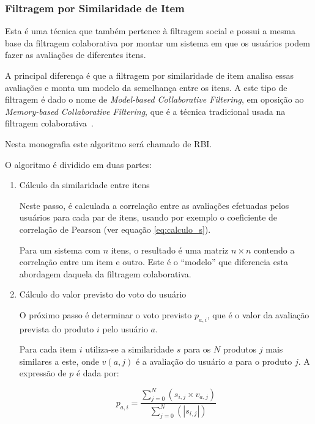 
\subsubsection{Filtragem por Similaridade de Item}

Esta é uma técnica que também pertence à filtragem social e possui a mesma base da filtragem colaborativa por montar um sistema em que os usuários podem fazer as avaliações de diferentes itens.

A principal diferença é que a filtragem por similaridade de item analisa essas avaliações e monta um modelo da semelhança entre os itens. A este tipo de filtragem é dado o nome de \textit{Model-based Collaborative Filtering}, em oposição ao \textit{Memory-based Collaborative Filtering}, que é a técnica tradicional usada na filtragem colaborativa~\cite{sarwar01}.

Nesta monografia este algoritmo será chamado de RBI.

O algoritmo é dividido em duas partes:

\begin{enumerate}
\item{Cálculo da similaridade entre itens}

Neste passo, é calculada a correlação entre as avaliações efetuadas pelos usuários para cada par de itens, usando por exemplo o coeficiente de correlação de Pearson (ver equação \ref{eq:calculo_s}).

Para um sistema com $n$ itens, o resultado é uma matriz $n \times n$ contendo a correlação entre um item e outro. Este é o ``modelo'' que diferencia esta abordagem daquela da filtragem colaborativa.

\item{Cálculo do valor previsto do voto do usuário}

O próximo passo é determinar o voto previsto $p_{a,i}$, que é o valor da avaliação prevista do produto $i$ pelo usuário $a$.

Para cada item $i$ utiliza-se a similaridade $s$ para os $N$ produtos $j$ mais similares a este, onde $v(a,j)$ é a avaliação do usuário $a$ para o produto $j$. A expressão de $p$ é dada por:

\begin{equation}
 p_{a,i} = \frac{\sum_{j=0}^N{(s_{i,j} \times v_{a, j})}}{\sum_{j=0}^N{(|s_{i,j}|)}}
 \label{eq:filtragem_item_based} 
\end{equation}

\end{enumerate}

